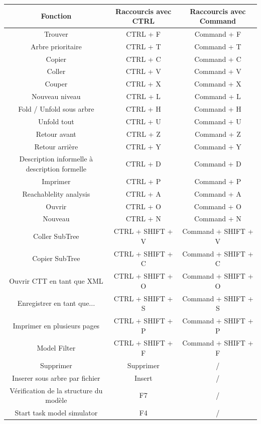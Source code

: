 \documentclass[12pt, a4paper]{article}
\begin{document}
\begin{tabular}{| c | c | c |}
\hline
Fonction & Raccourcis avec CTRL & Raccourcis avec Command \\ \hline
Trouver & CTRL + F & Command + F \\ \hline
Arbre prioritaire & CTRL + T & Command + T \\ \hline
Copier & CTRL + C & Command + C \\ \hline
Coller  & CTRL + V & Command + V \\ \hline
Couper & CTRL + X & Command + X \\ \hline
Nouveau niveau & CTRL + L & Command + L \\ \hline
Fold / Unfold sous arbre & CTRL + H & Command + H \\ \hline
Unfold tout & CTRL + U & Command + U \\ \hline
Retour avant & CTRL + Z & Command + Z \\ \hline
Retour arrière & CTRL + Y & Command + Y \\ \hline
Description informelle à description formelle & CTRL + D & Command + D \\ \hline
Imprimer & CTRL + P & Command + P \\ \hline
Reachablelity analysis  & CTRL + A & Command + A \\ \hline
Ouvrir & CTRL + O & Command + O \\ \hline
Nouveau & CTRL + N & Command + N \\ \hline
Coller SubTree & CTRL + SHIFT + V & Command + SHIFT + V \\ \hline
Copier SubTree & CTRL + SHIFT + C & Command + SHIFT + C \\ \hline
Ouvrir CTT en tant que XML  & CTRL + SHIFT + O & Command + SHIFT + O \\ \hline
Enregistrer en tant que... & CTRL + SHIFT + S & Command + SHIFT + S \\ \hline
Imprimer en plusieurs pages & CTRL + SHIFT + P & Command + SHIFT + P \\ \hline
Model Filter & CTRL + SHIFT + F & Command + SHIFT + F \\ \hline
Supprimer & Supprimer & / \\ \hline
Inserer sous arbre par fichier & Insert & / \\ \hline
Vérification de la structure du modèle & F7 & / \\ \hline
Start task model simulator & F4 & / \\ \hline
\end{tabular}
\end{document}
